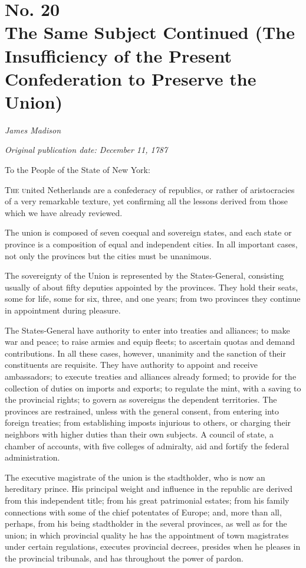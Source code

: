 \chapter[No. 20: The Same Subject Continued (The Insufficiency of the Present Confederation to Preserve the Union)]{No. 20\\ {\small The Same Subject Continued (The Insufficiency of the Present Confederation to Preserve the Union)}}

\textit{James Madison}

\textit{Original publication date: December 11, 1787}
\vspace{1cm}

To the People of the State of New York:
\vspace{.4cm}

\textsc{The u}nited Netherlands are a confederacy of republics, or rather of aristocracies of a very remarkable texture, yet confirming all the lessons derived from those which we have already reviewed.

The union is composed of seven coequal and sovereign states, and each state or province is a composition of equal and independent cities. 
In all important cases, not only the provinces but the cities must be unanimous.

The sovereignty of the Union is represented by the States-General, consisting usually of about fifty deputies appointed by the provinces. 
They hold their seats, some for life, some for six, three, and one years; from two provinces they continue in appointment during pleasure.

The States-General have authority to enter into treaties and alliances; to make war and peace; to raise armies and equip fleets; to ascertain quotas and demand contributions. 
In all these cases, however, unanimity and the sanction of their constituents are requisite. 
They have authority to appoint and receive ambassadors; to execute treaties and alliances already formed; to provide for the collection of duties on imports and exports; to regulate the mint, with a saving to the provincial rights; to govern as sovereigns the dependent territories. 
The provinces are restrained, unless with the general consent, from entering into foreign treaties; from establishing imposts injurious to others, or charging their neighbors with higher duties than their own subjects. 
A council of state, a chamber of accounts, with five colleges of admiralty, aid and fortify the federal administration.

The executive magistrate of the union is the stadtholder, who is now an hereditary prince. 
His principal weight and influence in the republic are derived from this independent title; from his great patrimonial estates; from his family connections with some of the chief potentates of Europe; and, more than all, perhaps, from his being stadtholder in the several provinces, as well as for the union; in which provincial quality he has the appointment of town magistrates under certain regulations, executes provincial decrees, presides when he pleases in the provincial tribunals, and has throughout the power of pardon.

